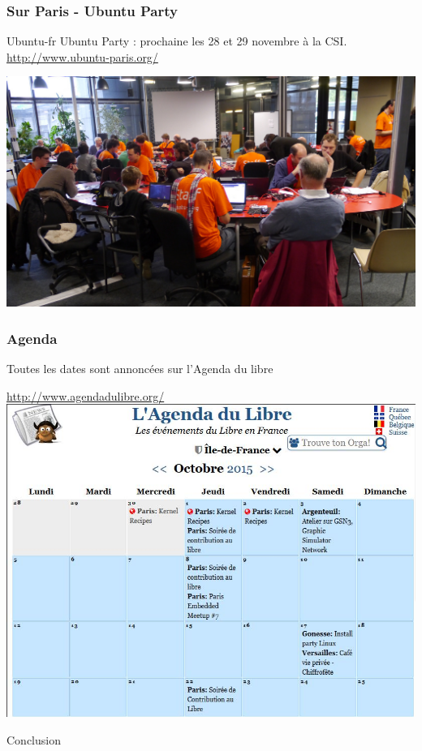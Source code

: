\documentclass{beamer}
\begin{document}
\begin{frame}
\frametitle{Sur Paris - Ubuntu Party}
\begin{block}{Ubuntu-fr}
Ubuntu Party : prochaine les 28 et 29 novembre à la CSI.\\
\url{http://www.ubuntu-paris.org/}
\end{block}
\begin{center}
\includegraphics[scale=0.3] {./images/ubuntu-paris.jpg}
\end{center} 
\end{frame}
\begin{frame}
\frametitle{Agenda}
Toutes les dates sont annoncées sur l'Agenda du libre 
\begin{center}
\url{http://www.agendadulibre.org/}
\\
\includegraphics[scale=0.55] {./images/agenda-du-libre.jpg}
\end{center} 

\end{frame}
\begin{frame}
\begin{center}
\Huge{Conclusion}
\end{center}
\end{frame}
\end{document}

